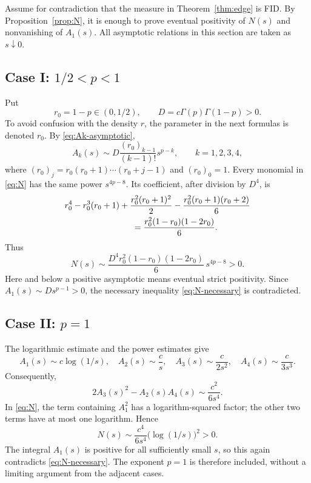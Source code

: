 \documentclass[11pt,a4paper]{article}
\theoremstyle{definition}
\theoremstyle{remark}
\begin{document}
Assume for contradiction that the measure in Theorem~\ref{thm:edge}
is FID. By Proposition~\ref{prop:N}, it is enough to prove eventual
positivity of $N(s)$ and nonvanishing of $A_1(s)$. All asymptotic
relations in this section are taken as $s\downarrow0$.

\subsection{Case I: \texorpdfstring{$1/2<p<1$}{1/2 < p < 1}}

Put
\[
 r_0=1-p\in(0,1/2),\qquad
 D=c\Gamma(p)\Gamma(1-p)>0.
\]
To avoid confusion with the density $r$, the parameter in the next
formulas is denoted $r_0$. By \eqref{eq:Ak-asymptotic},
\begin{equation}\label{eq:pochhammer}
 A_k(s)\sim D\frac{(r_0)_{k-1}}{(k-1)!}s^{p-k},
 \qquad k=1,2,3,4,
\end{equation}
where $(r_0)_j=r_0(r_0+1)\cdots(r_0+j-1)$ and $(r_0)_0=1$.
Every monomial in \eqref{eq:N} has the same power $s^{4p-8}$.
Its coefficient, after division by $D^4$, is
\begin{align*}
 &r_0^4-r_0^3(r_0+1)
   +\frac{r_0^2(r_0+1)^2}{2}
   -\frac{r_0^2(r_0+1)(r_0+2)}6\\
 &\hspace{28mm}=
 \frac{r_0^2(1-r_0)(1-2r_0)}6.
\end{align*}
Thus
\begin{equation}\label{eq:N-case-I}
 N(s)\sim
 \frac{D^4r_0^2(1-r_0)(1-2r_0)}6\,s^{4p-8}>0.
\end{equation}
Here and below a positive asymptotic means eventual strict
positivity. Since $A_1(s)\sim Ds^{p-1}>0$, the necessary inequality
\eqref{eq:N-necessary} is contradicted.

\subsection{Case II: \texorpdfstring{$p=1$}{p = 1}}

The logarithmic estimate and the power estimates give
\begin{equation}\label{eq:case-II-A}
 A_1(s)\sim c\log(1/s),\quad
 A_2(s)\sim\frac cs,\quad
 A_3(s)\sim\frac{c}{2s^2},\quad
 A_4(s)\sim\frac{c}{3s^3}.
\end{equation}
Consequently,
\[
 2A_3(s)^2-A_2(s)A_4(s)\sim\frac{c^2}{6s^4}.
\]
In \eqref{eq:N}, the term containing $A_1^2$ has a
logarithm-squared factor; the other two terms have at most one
logarithm. Hence
\begin{equation}\label{eq:N-case-II}
 N(s)\sim\frac{c^4}{6s^4}\bigl(\log(1/s)\bigr)^2>0.
\end{equation}
The integral $A_1(s)$ is positive for all sufficiently small $s$,
so this again contradicts \eqref{eq:N-necessary}. The exponent
$p=1$ is therefore included, without a limiting argument from
the adjacent cases.
\end{document}
